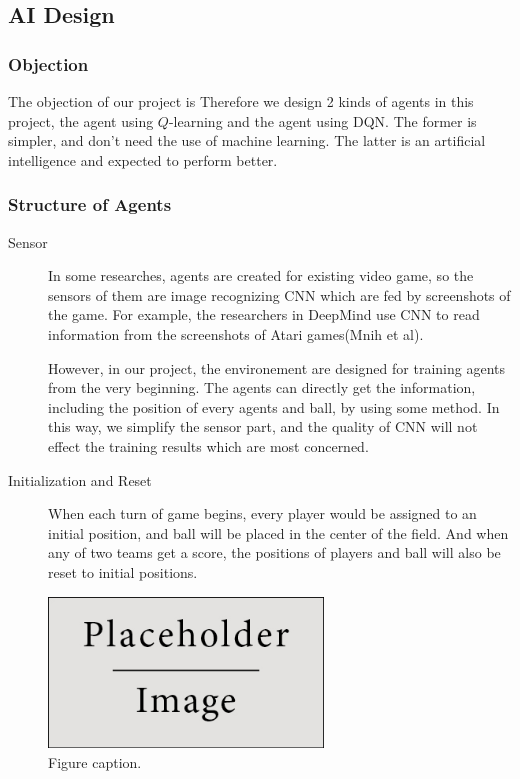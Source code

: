 \documentclass[14pt]{extarticle}
\begin{document}
\subsection{AI Design}
\subsubsection{Objection}
The objection of our project is %
Therefore we design 2 kinds of agents in this project, the agent using $Q$-learning and the agent using DQN. The former is simpler, and don't need the use of machine learning. The latter is an artificial intelligence and expected to perform better.
\subsubsection{Structure of Agents}

\begin{description}
	\item[Sensor]
    In some researches, agents are created for existing video game, so the sensors of them are image recognizing CNN which are fed by screenshots of the game. For example, the researchers in DeepMind use CNN to read information from the screenshots of Atari games(Mnih et al).

    However, in our project, the environement are designed for training agents from the very beginning. The agents can directly get the information, including the position of every agents and ball, by using some method. In this way, we simplify the sensor part, and the quality of CNN will not effect the training results which are most concerned.
    
	\item[Initialization and Reset]
    When each turn of game begins, every player would be assigned to an initial position, and ball will be placed in the center of the field. And when any of two teams get a score, the positions of players and ball will also be reset to initial positions.
    
\end{description}


\begin{figure}
\begin{center}
\includegraphics[width=0.65\textwidth]{placeholder} %
\caption{Figure caption.}
\end{center}
\end{figure}
\end{document}
